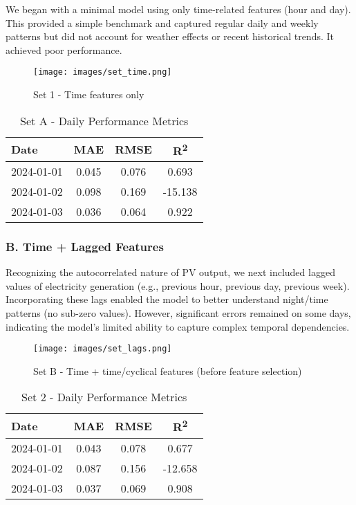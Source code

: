We began with a minimal model using only time-related features (hour and day). This 
provided a simple benchmark and captured regular daily and weekly patterns but did not 
account for weather effects or recent historical trends. It achieved poor performance. 

\begin{figure}[H]
    \centering
    \texttt{[image: images/set\_time.png]}
    \caption{Set 1 - Time features only}
    \label{fig:set1-forecast-profile}
\end{figure}

\begin{table}[H]
    \centering
    \begin{tabular}{lccc}
        Date        & MAE    & RMSE   & R\textsuperscript{2} \\
        \hline
        2024-01-01  & 0.045  & 0.076  & 0.693 \\
        2024-01-02  & 0.098  & 0.169  & -15.138 \\
        2024-01-03  & 0.036  & 0.064  & 0.922 \\
    \end{tabular}
    \caption{Set A - Daily Performance Metrics}
\end{table}

\subsubsection*{B. Time + Lagged Features}
Recognizing the autocorrelated nature of PV output, we next included lagged values of 
electricity generation (e.g., previous hour, previous day, previous week). Incorporating 
these lags enabled the model to better understand night/time patterns (no sub-zero values). However, 
significant errors remained on some days, indicating the model's limited ability to 
capture complex temporal dependencies.

\begin{figure}[H]
    \centering
    \texttt{[image: images/set\_lags.png]}
    \caption{Set B - Time + time/cyclical features (before feature selection)}
\end{figure}

\begin{table}[H]
    \centering
    \begin{tabular}{lccc}
        Date        & MAE    & RMSE   & R\textsuperscript{2} \\
        \hline
        2024-01-01  & 0.043  & 0.078  & 0.677 \\
        2024-01-02  & 0.087  & 0.156  & -12.658 \\
        2024-01-03  & 0.037  & 0.069  & 0.908 \\
    \end{tabular}
    \caption{Set 2 - Daily Performance Metrics}
\end{table}


